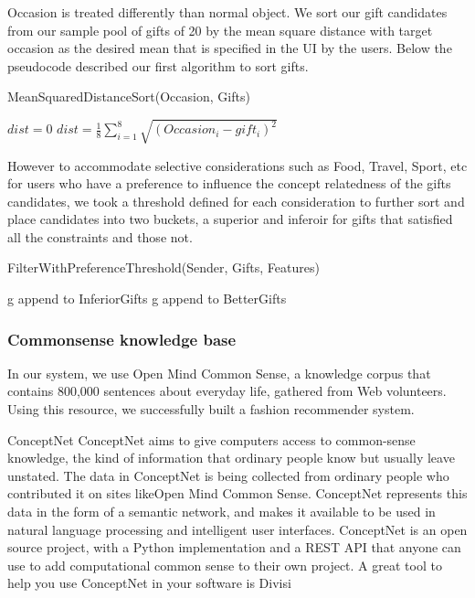 \documentclass[11pt,twocolumn]{article}
\begin{document}
Occasion is treated differently than normal object. We sort our gift candidates from our sample pool of gifts of 20 by the mean square distance with target occasion as the desired mean that is specified in the UI by the users. Below the pseudocode described our first algorithm to sort gifts.

\begin{algorithm}
\caption{MeanSquaredDistanceSort(Occasion, Gifts)}
\label{msd}
\begin{algorithmic}
\STATE $dist = 0$
\STATE $dist = \frac{1}{8} \sum_{i=1}^{8} \sqrt{(Occasion_i - gift_i)^2}$
\ENDFOR
\end{algorithmic}
\end{algorithm}


However to accommodate selective considerations such as Food, Travel, Sport, etc for users who have a preference to influence the concept relatedness of the gifts candidates, we took a threshold defined for each consideration to further sort and place candidates into two buckets, a superior and inferoir for gifts that satisfied all the constraints and those not.

\begin{algorithm}
\caption{FilterWithPreferenceThreshold(Sender, Gifts, Features)}
\label{fpt}
\begin{algorithmic}
        \STATE g append to InferiorGifts
        \STATE g append to BetterGifts
        \ENDIF
    \ENDFOR
\ENDFOR
\end{algorithmic}
\end{algorithm}


\subsubsection{Commonsense knowledge base}
In our system, we use Open Mind Common Sense, a knowledge corpus that contains 800,000 sentences about everyday life, gathered from Web volunteers. Using this resource, we successfully built a fashion recommender system.

{\large ConceptNet}
ConceptNet aims to give computers access to common-sense knowledge, the kind of information that ordinary people know but usually leave unstated.
The data in ConceptNet is being collected from ordinary people who contributed it on sites likeOpen Mind Common Sense. ConceptNet represents this data in the form of a semantic network, and makes it available to be used in natural language processing and intelligent user interfaces.
ConceptNet is an open source project, with a Python implementation and a REST API that anyone can use to add computational common sense to their own project. A great tool to help you use ConceptNet in your software is Divisi
\end{document}
